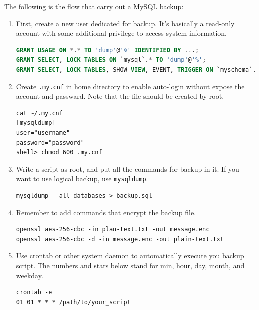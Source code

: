 \documentclass[conference]{IEEEtran}
\begin{document}
The following is the flow that carry out a MySQL backup:
\begin{enumerate}[label=\textbf{\arabic*.}]
    \item
First, create a new user dedicated for backup. It's basically a read-only
account with some additional privilege to access system information.
\begin{lstlisting}[language=sql]
GRANT USAGE ON *.* TO 'dump'@'%' IDENTIFIED BY ...;
GRANT SELECT, LOCK TABLES ON `mysql`.* TO 'dump'@'%';
GRANT SELECT, LOCK TABLES, SHOW VIEW, EVENT, TRIGGER ON `myschema`.* TO 'dump'@'\%';
\end{lstlisting}

\item
Create \lstinline{.my.cnf} in home directory to enable auto-login
without expose the account and passward. Note that the file should be
created by root.

\begin{lstlisting}
cat ~/.my.cnf
[mysqldump]
user="username"
password="password"
shell> chmod 600 .my.cnf
\end{lstlisting}

\item
Write a script as root, and put all the commands for backup in it.
If you want to use logical backup, use \lstinline{mysqldump}.
\begin{lstlisting}
mysqldump --all-databases > backup.sql
\end{lstlisting}

\item
Remember to add commands that encrypt the backup file.
%
\begin{lstlisting}
openssl aes-256-cbc -in plan-text.txt -out message.enc
openssl aes-256-cbc -d -in message.enc -out plain-text.txt
\end{lstlisting}

\item
Use crontab or other system daemon to automatically execute you backup script.
The numbers and stars below stand for min, hour, day, month, and weekday.
\begin{lstlisting}
crontab -e
01 01 * * * /path/to/your_script
\end{lstlisting}

\end{enumerate}
\end{document}
